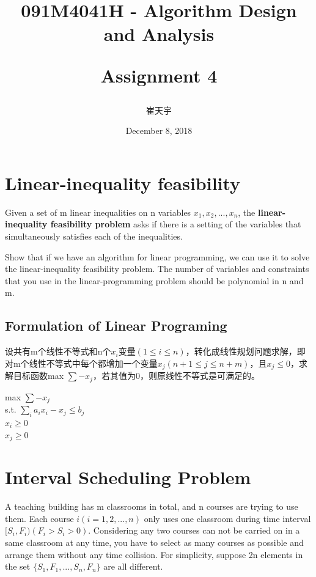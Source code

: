 \documentclass{article}
\begin{document}

\title{091M4041H - Algorithm Design and Analysis\\ [2ex] \begin{large} Assignment 4 \end{large}}
\author{崔天宇}
\date{December 8, 2018}

\maketitle

\tableofcontents

\newpage
\section{Linear-inequality feasibility}
Given a set of m linear inequalities on n variables $x_1,x_2,...,x_n$, the \textbf{linear-inequality feasibility problem} asks if there is a setting of the variables that simultaneously satisfies each of the inequalities. 

Show that if we have an algorithm for linear programming, we can use it to solve the linear-inequality feasibility problem. The number of variables and constraints that you use in the linear-programming problem should be polynomial in n and m.


\subsection{Formulation of Linear Programing}
设共有m个线性不等式和n个$x_i$变量$(1\leq i\leq n)$，转化成线性规划问题求解，即对m个线性不等式中每个都增加一个变量$x_j$$(n+1\leq j\leq n+m)$，且$x_j\leq0$，求解目标函数max $\sum-x_j$，若其值为0，则原线性不等式是可满足的。

\begin{center}
max $\sum-x_j$\\
s.t. $\sum_ia_{i}x_i -x_j \leq b_j$\\
$x_i \geq 0$\\
$x_j \geq 0$\\
\end{center} 



\newpage
\section{Interval Scheduling Problem}
A teaching building has m classrooms in total, and n courses are trying to use them. Each course $i (i = 1,2,... ,n)$ only uses one classroom during time interval $[S_i,F_i) (F_i > S_i > 0)$. Considering any two courses can not be carried on in a same classroom at any time, you have to select as many courses as possible and arrange them without any time collision. For simplicity, suppose 2n elements in the set $\{S_1,F_1,... ,S_n,F_n\}$ are all different.
\end{document}
